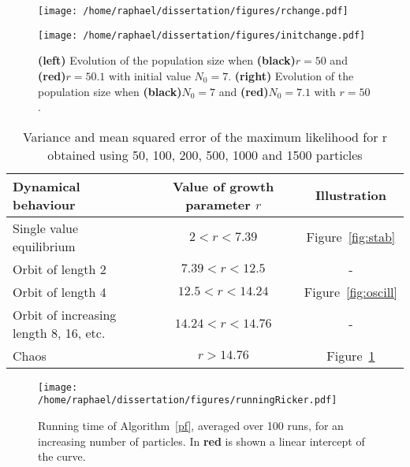 \documentclass[12pt]{article}
\newcommand{\ra}[1]{\renewcommand{\arraystretch}{#1}}
\begin{document}
	\begin{figure}[htb]
		\centering
		\begin{minipage}{0.4\textwidth}
			\centering
			\texttt{[image: /home/raphael/dissertation/figures/rchange.pdf]}
		\end{minipage}
		\begin{minipage}{0.4\textwidth}
			\centering
			\texttt{[image: /home/raphael/dissertation/figures/initchange.pdf]}
		\end{minipage}
		\caption{\textbf{(left)} Evolution of the population size when \textbf{(black)}$r=50$ and \textbf{(red)}$r=50.1$ with initial value $N_0=7$. \textbf{(right)} Evolution of the population size when \textbf{(black)}$N_0=7$ and \textbf{(red)}$N_0=7.1$ with $r=50$.}
		\label{fig:chaos}
	\end{figure}

	\begin{table}[htb]
		\centering
		\ra{1.3}
		\begin{tabular}{@{}lcc@{}} \toprule
			Dynamical behaviour & Value of growth parameter $r$ &  Illustration \\ \midrule
			Single value equilibrium & $2<r<7.39$ & Figure~\ref{fig:stab}\\ 
			Orbit of length 2 & $7.39<r<12.5$ & - \\ 
			Orbit of length 4 & $12.5<r<14.24$ & Figure~\ref{fig:oscill}\\ 
			Orbit of increasing length 8, 16, etc. & $14.24<r<14.76$ & - \\ 
			Chaos &  $r>14.76$ &  Figure~\ref{fig:chaos} \\ \bottomrule
		\end{tabular}
		\caption{Variance and mean squared error of the maximum likelihood for r obtained using 50, 100, 200, 500, 1000 and 1500 particles}
		\label{valuesr}
	\end{table}	
	

	\begin{figure}[htb]
		\centering
		\begin{minipage}{0.4\textwidth}
			\centering
			\texttt{[image: /home/raphael/dissertation/figures/runningRicker.pdf]}
		\end{minipage}
		\caption{Running time of Algorithm~\ref{pf}, averaged over 100 runs, for an increasing number of particles. In \textbf{red} is shown a linear intercept of the curve.}
		\label{fig:runningRicker}
	\end{figure}
\end{document}
